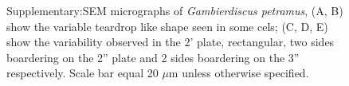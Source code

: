 \documentclass[12pt]{article}
\begin{document}
\FloatBarrier 
\begin{figure} 
\caption{Supplementary:SEM micrographs of \emph{Gambierdiscus petramus}, (A, B) show the variable teardrop like shape seen in some cels; (C, D, E) show the variability observed in the 2' plate, rectangular, two sides boardering on the 2'' plate and 2 sides boardering on the 3'' respectively. Scale bar equal 20 $\mu$m unless otherwise specified.} 
\label{fig:varSEM}
\end{figure} 
\FloatBarrier
\newpage


\end{document}
